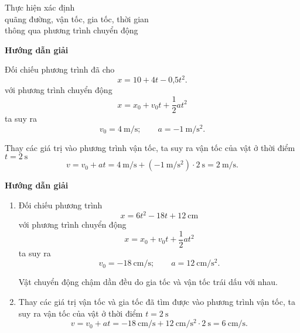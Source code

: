 \begin{dang}{Thực hiện xác định \\quãng đường, vận tốc, gia tốc, thời gian \\thông qua phương trình chuyển động }
	{	\begin{center}
			\textbf{Hướng dẫn giải}
		\end{center}
		
		Đối chiếu phương trình đã cho
		$$x = 10 + 4t - \text{0,5}t^2.$$
		với phương trình chuyển động
		$$x=x_0+v_0t+\dfrac{1}{2}at^{2}$$
		ta suy ra $$v_0 = \SI{4}{\meter/\second};\qquad a =\SI{-1}{\meter/\second^2}.$$
		
		Thay các giá trị vào phương trình vận tốc, ta suy ra vận tốc của vật ở thời điểm  $t =\SI{2}{\second}$
		$$v=v_0+at=\SI{4}{\meter/\second}+\left(\SI{-1}{\meter/\second^{2}}\right)\cdot\SI{2}{\second}=\SI{2}{\meter/\second}.$$

	}
	{	\begin{center}
			\textbf{Hướng dẫn giải}
		\end{center}
		
		\begin{enumerate}[label=\alph*.]
			\item Đối chiếu phương trình 
				$$x = 6t^2 - 18t + 12 \ \text{cm}$$
			với phương trình chuyển động
			$$x=x_0+v_0t+\dfrac{1}{2}at^{2}$$
			ta suy ra
			$$v_0 = \SI{-18}{\centi\meter/\second};\qquad a =\SI{12}{\centi\meter/\second^{2}}.$$
			
			Vật chuyển động chậm dần đều do gia tốc và vận tốc trái dấu với nhau.
			\item Thay các giá trị vận tốc và gia tốc đã tìm được vào phương trình vận tốc, ta suy ra vận tốc của vật ở thời điểm $t=\SI{2}{\second}$
			$$v =v_0 +at =\SI{-18}{\centi\meter/\second}+\SI{12}{\centi\meter/\second^{2}}\cdot\SI{2}{\second}=\SI{6}{\centi\meter/\second}.$$
		\end{enumerate}
	}
	

\end{dang}
